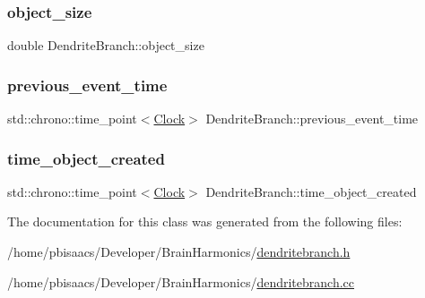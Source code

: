 \mbox{\label{classDendriteBranch_a19c3bd5c518cf8b4fdae49586ad0df4b}} 
\subsubsection{\texorpdfstring{object\+\_\+size}{object\_size}}
{\footnotesize\ttfamily double Dendrite\+Branch\+::object\+\_\+size\hspace{0.3cm}{\ttfamily [private]}}

\mbox{\label{classDendriteBranch_a16bdc976d615cf2b1b5e3238241e19b6}} 
\subsubsection{\texorpdfstring{previous\+\_\+event\+\_\+time}{previous\_event\_time}}
{\footnotesize\ttfamily std\+::chrono\+::time\+\_\+point$<$\mbox{\hyperlink{universe_8h_a0ef8d951d1ca5ab3cfaf7ab4c7a6fd80}{Clock}}$>$ Dendrite\+Branch\+::previous\+\_\+event\+\_\+time\hspace{0.3cm}{\ttfamily [private]}}

\mbox{\label{classDendriteBranch_a253b94811cb4a0697446dc3d572f91de}} 
\subsubsection{\texorpdfstring{time\+\_\+object\+\_\+created}{time\_object\_created}}
{\footnotesize\ttfamily std\+::chrono\+::time\+\_\+point$<$\mbox{\hyperlink{universe_8h_a0ef8d951d1ca5ab3cfaf7ab4c7a6fd80}{Clock}}$>$ Dendrite\+Branch\+::time\+\_\+object\+\_\+created\hspace{0.3cm}{\ttfamily [private]}}



The documentation for this class was generated from the following files\+:\begin{DoxyCompactItemize}
\item 
/home/pbisaacs/\+Developer/\+Brain\+Harmonics/\mbox{\hyperlink{dendritebranch_8h}{dendritebranch.\+h}}\item 
/home/pbisaacs/\+Developer/\+Brain\+Harmonics/\mbox{\hyperlink{dendritebranch_8cc}{dendritebranch.\+cc}}\end{DoxyCompactItemize}
